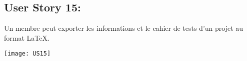 \newpage{}
\subsection{User Story 15:}
Un membre peut exporter les informations et le cahier de tests d'un projet au format \LaTeX{}.


  \begin{center}
        \texttt{[image: US15]}
  \end{center}